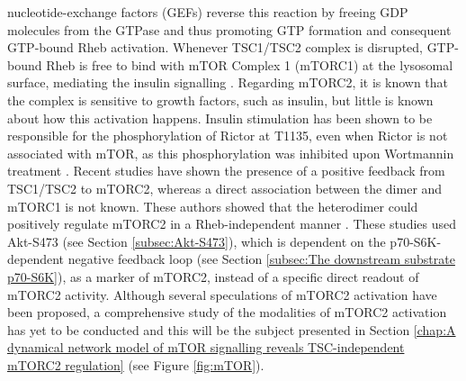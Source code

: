 nucleotide-exchange factors (GEFs) reverse this reaction by freeing GDP molecules from the GTPase and thus promoting GTP formation and consequent GTP-bound Rheb activation. Whenever TSC1/TSC2 complex is disrupted, GTP-bound Rheb is free to bind with mTOR Complex 1 (mTORC1) at the lysosomal surface, mediating the insulin signalling \citep{Huang2008review}. Regarding mTORC2, it is known that the complex is sensitive to growth factors, such as insulin, but little is known about how this activation happens. Insulin stimulation has been shown to be responsible for the phosphorylation of Rictor at T1135, even when Rictor is not associated with mTOR, as this phosphorylation was inhibited upon Wortmannin treatment \citep{Boulbes2010}. Recent studies have shown the presence of a positive feedback from TSC1/TSC2 to mTORC2, whereas a direct association between the dimer and mTORC1 is not known. These authors showed that the heterodimer could positively regulate mTORC2 in a Rheb-independent manner \citep{Huang2008, 
Rosner2008, Sparks2010}. These studies used Akt-S473 (see Section \ref{subsec:Akt-S473}), which is dependent on the p70-S6K-dependent negative feedback loop (see Section \ref{subsec:The downstream substrate p70-S6K}), as a marker of mTORC2, instead of a specific direct readout of mTORC2 activity. Although several speculations of mTORC2 activation have been proposed, a comprehensive study of the modalities of mTORC2 activation has yet to be conducted and this will be the subject presented in Section \ref{chap:A dynamical network model of mTOR signalling reveals TSC-independent mTORC2 regulation} (see Figure \ref{fig:mTOR}).

